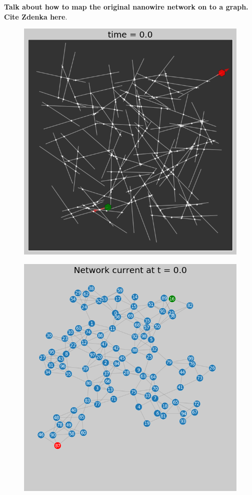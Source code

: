 \documentclass[fleqn,10pt,  amsmath,amssymb,aps]{wlscirep}
\begin{document}
\textbf{Talk about how to map the original nanowire network on to a graph. Cite Zdenka here}.

\begin{figure}[h]
	\centering
	\includegraphics[width=0.8\linewidth]{figure/mpl_plot}
	\caption{}
	\label{fig:mpl_plot}
\end{figure}

\begin{figure}[h]
	\centering
	\includegraphics[width=0.8\linewidth]{figure/graph_plot}
	\caption{}
	\label{fig:graph_plot}
\end{figure}
\end{document}
